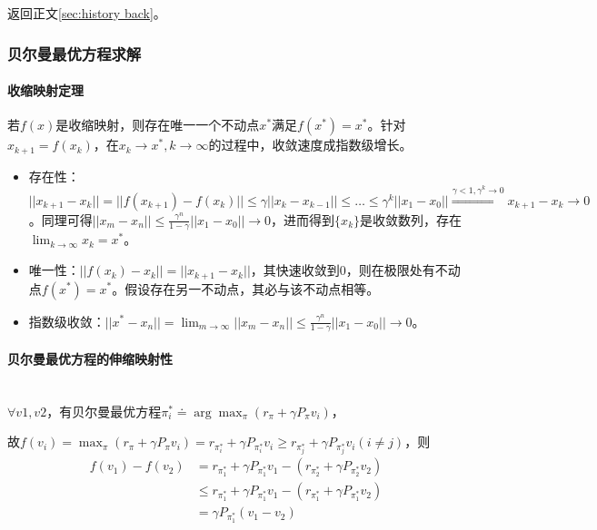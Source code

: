 \documentclass[
12pt, %
a4paper, 
oneside, %
headinclude,footinclude, %
]{scrartcl}
\begin{document}
返回正文\ref{sec:history back}。
\subsubsection[贝尔曼最优方程求解]{贝尔曼最优方程求解}\label{sec:Scalability Mapping}
\paragraph{收缩映射定理}
若$ f(x) $是收缩映射，则存在唯一一个不动点$ x^* $满足$ f(x^*) = x^* $。针对$ x_{k + 1} = f(x_k) $，在$ x_k \to x^*, k \to \infty $的过程中，收敛速度成指数级增长。
\begin{itemize}
\item 存在性：$ ||x_{k + 1} - x_k|| = ||f(x_{k + 1}) - f(x_k)|| \leq \gamma||x_k - x_{k - 1}|| \leq \dots \leq \gamma^k||x_1 - x_0|| \overset{\gamma < 1, \gamma^k \to 0}{\Longrightarrow} x_{k + 1} - x_k \to 0 $。同理可得$ ||x_m - x_n|| \leq \frac{\gamma^n}{1 - \gamma}||x_1 - x_0|| \to 0 $，进而得到$ \{x_k\} $是收敛数列，存在$ \lim_{k \to \infty} x_k = x^* $。
\item 唯一性：$ ||f(x_k) - x_k|| = ||x_{k + 1} - x_k|| $，其快速收敛到$ 0 $，则在极限处有不动点$ f(x^*) = x^* $。假设存在另一不动点，其必与该不动点相等。
\item 指数级收敛：$ ||x^* - x_n|| = \lim_{m \to \infty}||x_m - x_n|| \leq \frac{\gamma^n}{1 - \gamma}||x_1 - x_0|| \to 0 $。
\end{itemize}
\paragraph{贝尔曼最优方程的伸缩映射性}~\\

$ \forall v1,v2 $，有贝尔曼最优方程$ \pi_i^* \doteq \arg \max_{\pi}(r_\pi + \gamma P_\pi v_i) $，

故$ f(v_i) = \max_{\pi}(r_\pi + \gamma P_\pi v_i) = r_{\pi_i^*} + \gamma P_{\pi_i^*} v_i \geq r_{\pi_j^*} + \gamma P_{\pi_j^*} v_i (i \neq j) $，则
\begin{align*}
f(v_1) - f(v_2) 
&= r_{\pi_1^*} + \gamma P_{\pi_1^*} v_1 - (r_{\pi_2^*} + \gamma P_{\pi_2^*} v_2) \\
&\leq r_{\pi_1^*} + \gamma P_{\pi_1^*} v_1 - (r_{\pi_1^*} + \gamma P_{\pi_1^*} v_2) \\
&= \gamma P_{\pi_1^*} (v_1 - v_2)
\end{align*}
\end{document}
